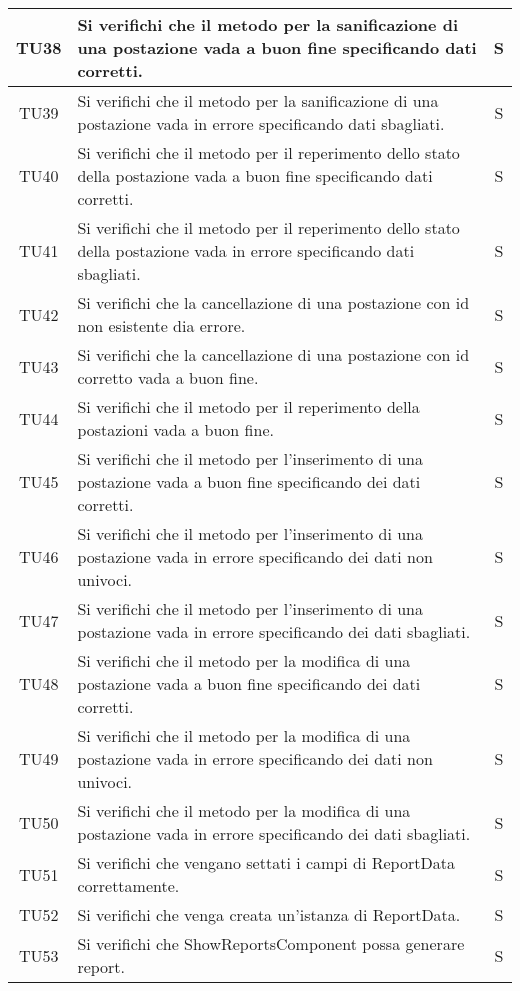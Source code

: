 \begin{center}
\begin{longtable}{|c|p{10cm}|c|}
			TU38 & Si verifichi che il metodo per la sanificazione di una postazione vada a buon fine specificando dati corretti. & S \\	
			\hline
			TU39 & Si verifichi che il metodo per la sanificazione di una postazione vada in errore specificando dati sbagliati. & S \\	
			\hline
			TU40 & Si verifichi che il metodo per il reperimento dello stato della postazione vada a buon fine specificando dati corretti. & S \\	
			\hline
			TU41 & Si verifichi che il metodo per il reperimento dello stato della postazione vada in errore specificando dati sbagliati. & S \\	
			\hline
			TU42 & Si verifichi che la cancellazione di una postazione con id non esistente dia errore. & S \\	
			\hline
			TU43 & Si verifichi che la cancellazione di una postazione con id corretto vada a buon fine. & S \\	
			\hline
			TU44 & Si verifichi che il metodo per il reperimento della postazioni vada a buon fine. & S \\	
			\hline
			TU45 & Si verifichi che il metodo per l'inserimento di una postazione vada a buon fine specificando dei dati corretti. & S \\	
			\hline
			TU46 & Si verifichi che il metodo per l'inserimento di una postazione vada in errore specificando dei dati non univoci. & S \\	
			\hline
			TU47 & Si verifichi che il metodo per l'inserimento di una postazione vada in errore specificando dei dati sbagliati. & S \\	
			\hline
			TU48 & Si verifichi che il metodo per la modifica di una postazione vada a buon fine specificando dei dati corretti. & S \\	
			\hline
			TU49 & Si verifichi che il metodo per la modifica di una postazione vada in errore specificando dei dati non univoci. & S \\	
			\hline
			TU50 & Si verifichi che il metodo per la modifica di una postazione vada in errore specificando dei dati sbagliati. & S \\	
			\hline
			TU51 & Si verifichi che vengano settati i campi di ReportData correttamente. & S \\	
			\hline
			TU52 & Si verifichi che venga creata un'istanza di ReportData. & S \\	
			\hline
			TU53 & Si verifichi che ShowReportsComponent possa generare report. & S \\	

\end{longtable}
\end{center}

